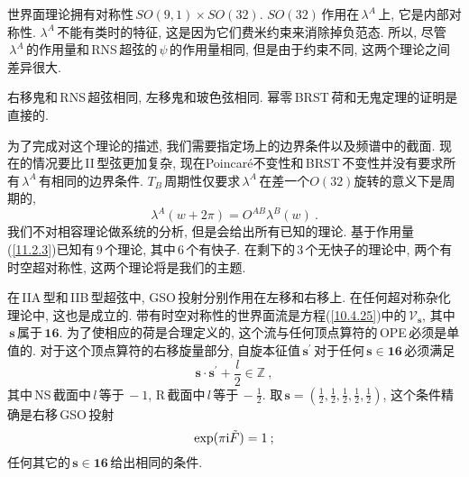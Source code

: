 世界面理论拥有对称性$\,SO(9,1)\times SO(32)$. $SO(32)$\,作用在$\,\lambda^{A}\,$上, 它是内部对称性. $\lambda^{A}$\,不能有类时的特征, 这是因为它们费米约束来消除掉负范态. 所以, 尽管$\,\lambda^{A}\,$的作用量和\,RNS\,超弦的$\,\psi\,$的作用量相同, 但是由于约束不同, 这两个理论之间差异很大.

右移鬼和\,RNS\,超弦相同, 左移鬼和玻色弦相同. 幂零\,BRST\,荷和无鬼定理的证明是直接的. 

为了完成对这个理论的描述, 我们需要指定场上的边界条件以及频谱中的截面. 现在的情况要比\,II\,型弦更加复杂, 现在Poincar\'{e}不变性和\,BRST\,不变性并没有要求所有$\,\lambda^{A}\,$有相同的边界条件. $T_{B}\,$周期性仅要求$\,\lambda^{A}\,$在差一个$O(32)$旋转的意义下是周期的,
\begin{equation}
    \lambda^{A}(w+2\pi) = O^{AB}\lambda^{B}(w) \:. \label{11.2.6} 
\end{equation}
我们不对相容理论做系统的分析, 但是会给出所有已知的理论. 基于作用量(\ref{11.2.3})已知有\,9\,个理论, 其中\,6\,个有快子. 在剩下的\,3\,个无快子的理论中, 两个有时空超对称性, 这两个理论将是我们的主题.

在\,IIA\,型和\,IIB\,型超弦中, GSO\,投射分别作用在左移和右移上. 在任何超对称杂化理论中, 这也是成立的. 带有时空对称性的世界面流是方程(\ref{10.4.25})中的$\,\mathscr{V}_{\mathbf{s}}$, 其中$\,\mathbf{s}\,$属于$\,\mathbf{16}$. 为了使相应的荷是合理定义的, 这个流与任何顶点算符的\,OPE\,必须是单值的. 对于这个顶点算符的右移旋量部分, 自旋本征值$\,\mathbf{s}^{\prime}\,$对于任何$\,\mathbf{s}\in\mathbf{16}\,$必须满足
\begin{equation}
    \mathbf{s}\cdot \mathbf{s}^{\prime} + \frac{l}{2} \in \mathds{Z} \:, \label{11.2.7}
\end{equation}
其中\,NS\,截面中$\,l\,$等于$\,-1$, R\,截面中$\,l\,$等于$\,-\frac{1}{2}$. 取$\,\mathbf{s}=(\frac{1}{2},\frac{1}{2},\frac{1}{2},\frac{1}{2},\frac{1}{2})$, 这个条件精确是右移\,GSO\,投射
\begin{equation}
    \exp(\pi\mathrm{i}\tilde{F})=1\: ; \label{11.2.8}
\end{equation}
任何其它的$\,\mathbf{s}\in\mathbf{16}\,$给出相同的条件.

